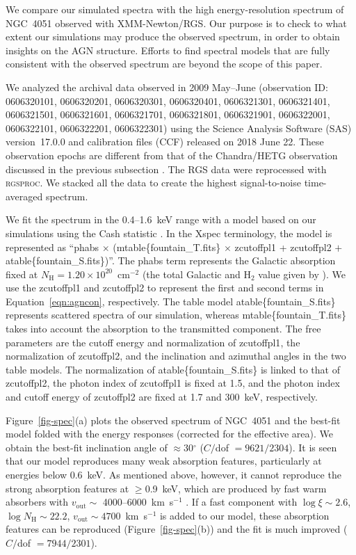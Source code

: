\documentclass[twocolumn,times,twocolappendix]{aastex63}
\begin{document}
We compare our simulated spectra with the high energy-resolution spectrum
of NGC~4051 observed with XMM-Newton/RGS\citep{den_Herder2001}. 
Our purpose is to check to what extent our simulations
may produce the observed spectrum, in order to obtain insights on the
AGN structure. Efforts to find spectral models that are fully
consistent with the observed spectrum are beyond the scope of this
paper.

We analyzed the archival data observed in 2009 May--June (observation ID:
0606320101, 0606320201, 0606320301, 0606320401, 0606321301,
0606321401, 0606321501, 0606321601, 0606321701, 0606321801,
0606321901, 0606322001, 0606322101, 0606322201, 0606322301) using the
Science Analysis Software (SAS) version~17.0.0 and calibration files
(CCF) released on 2018 June 22. 
These observation epochs are different from that of the Chandra/HETG
observation discussed in the previous subsection \citep{Lobban2011}.
The RGS data were reprocessed with
\textsc{rgsproc}. We stacked all the data to create the highest
signal-to-noise time-averaged spectrum.

We fit the spectrum in the 0.4--1.6~keV range with a model based on our
simulations using the Cash statistic \citep{Cash1979}.
In the Xspec terminology, the model is represented as 
``\textsf{phabs} $\times$ (\textsf{mtable\{fountain\_T.fits\}} $\times$
\textsf{zcutoffpl1 + zcutoffpl2} $+$ \textsf{atable\{fountain\_S.fits\}})''. 
The \textsf{phabs} term represents the Galactic absorption fixed at
$N_\mathrm{H} = 1.20 \times 10^{20}$~cm$^{-2}$ (the total Galactic 
and H$_2$ value given by \citealt{Willingale2013}). 
We use the \textsf{zcutoffpl1} and \textsf{zcutoffpl2} to represent the first and second terms in Equation~\ref{eqn:agncon}, respectively.
The table model
\textsf{atable\{fountain\_S.fits\}} represents scattered spectra of our simulation, whereas \textsf{mtable\{fountain\_T.fits\}}
takes into account the absorption to the transmitted component.
The free parameters are the cutoff energy and normalization of 
\textsf{zcutoffpl1}, the normalization of \textsf{zcutoffpl2},
 and the inclination and azimuthal angles in the two table models.
The normalization of \textsf{atable\{fountain\_S.fits\}} is linked to that of \textsf{zcutoffpl2},
the photon index of \textsf{zcutoffpl1} is fixed at 1.5,
and the photon index and cutoff energy of \textsf{zcutoffpl2} are fixed at 1.7 and 300~keV, respectively.

Figure~\ref{fig-spec}(a) plots the observed spectrum of NGC~4051
and the best-fit model
folded with the energy responses
(corrected for the effective area).
We obtain the best-fit inclination angle of $\approx$30$^\circ$ ($C/$dof $= 9621/2304$).
It is seen that our model 
reproduces many weak absorption features, particularly at energies
below 0.6~keV. As mentioned above, however, it cannot reproduce the
strong absorption features at $\geq$0.9~keV, which are produced by
fast warm absorbers with $v_\mathrm{out} \sim$ 4000--6000~km~s$^{-1}$ \citep{Pounds2011,Silva2016,Mizumoto2017}.
If a fast component with $\log \xi \sim 2.6$, $\log N_\mathrm{H} \sim 22.2$, $v_\mathrm{out} \sim 4700$~km~s$^{-1}$ is added to our model,
these absorption features can be reproduced (Figure~\ref{fig-spec}(b)) and the fit is much improved ($C/$dof $= 7944/2301$).
\end{document}
